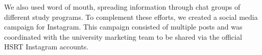We also used word of mouth, spreading information through chat groups of different study programs. To complement these efforts, we created a social media campaign for Instagram. This campaign consisted of multiple posts and was coordinated with the university marketing team to be shared via the official HSRT Instagram accounts.

